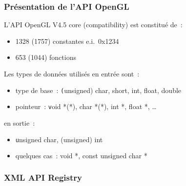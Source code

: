 
\begin{frame}
  \frametitle{Présentation de l'API OpenGL}
  L'API OpenGL V4.5 core {\tiny (compatibility)} est constitué de~:
  \begin{itemize}
  \item 1328 {\tiny (1757)} constantes e.i.\ 0x1234
  \item 653 {\tiny (1044)} fonctions \\[.5em]
  \end{itemize}
  Les types de données utilisés en entrée sont~:
  \begin{itemize}
  \item type de base~: {\texttt (unsigned) char, short, int, float, double}
  \item pointeur~: {\texttt void *(*), char *(*), int *, float *, \ldots} \\[.5em]
  \end{itemize}
  en sortie~:
  \begin{itemize}
  \item {\texttt unsigned char, (unsigned) int}
  \item quelques cas~: {void *, const unsigned char *}
  \end{itemize}
\end{frame}

\begin{frame}
  \frametitle{XML API Registry}
\end{frame}

